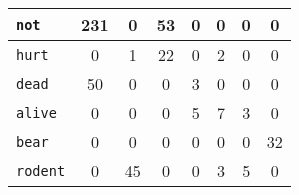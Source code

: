 \begin{table}[H]
\begin{tabular}{|l|c|c|c|c|c|c|c|}
						\texttt{not}        & 231                                     & \textcolor{irl}{0}                       & 53                                                & \textcolor{irl}{0}             & \textcolor{irl}{0}                          & \textcolor{irl}{0}                                & \textcolor{irl}{0}                     \\ \hline
						\texttt{hurt}       & \textcolor{irl}{0}                      & 1                                        & 22                                                & \textcolor{irl}{0}             & 2                                           & \textcolor{irl}{0}                                & \textcolor{irl}{0}                     \\ \hline
						\texttt{dead}       & 50                                      & \textcolor{irl}{0}                       & \textcolor{irl}{0}                                & 3                              & \textcolor{irl}{0}                          & \textcolor{irl}{0}                                & \textcolor{irl}{0}                     \\ \hline
						\texttt{alive}      & \textcolor{irl}{0}                      & \textcolor{irl}{0}                       & \textcolor{irl}{0}                                & 5                              & 7                                           & 3                                                 & \textcolor{irl}{0}                     \\ \hline
						\texttt{bear}       & \textcolor{irl}{0}                      & \textcolor{irl}{0}                       & \textcolor{irl}{0}                                & \textcolor{irl}{0}             & \textcolor{irl}{0}                          & \textcolor{irl}{0}                                & 32                                     \\ \hline
						\texttt{rodent}     & \textcolor{irl}{0}                      & 45                                       & \textcolor{irl}{0}                                & \textcolor{irl}{0}             & 3                                           & 5                                                 & \textcolor{irl}{0}                     \\ \hline
					\end{tabular}
				\end{table}

